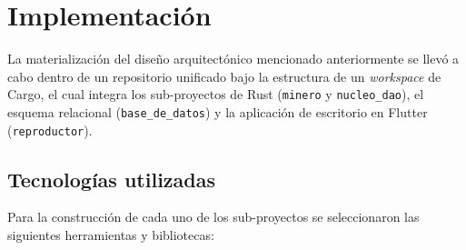 \section{Implementación}

La materialización del diseño arquitectónico mencionado anteriormente se llevó a cabo dentro de un repositorio unificado bajo la estructura de un \textit{workspace} de Cargo, el cual integra los sub-proyectos de Rust (\texttt{minero} y \texttt{nucleo\_dao}), el esquema relacional (\texttt{base\_de\_datos}) y la aplicación de escritorio en Flutter (\texttt{reproductor}).

\subsection{Tecnologías utilizadas}
Para la construcción de cada uno de los sub-proyectos se seleccionaron las siguientes herramientas y bibliotecas: 

